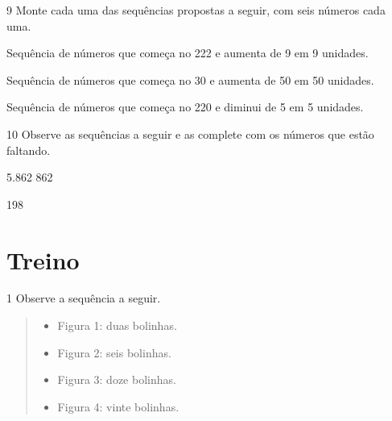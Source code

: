 \begin{mdframed}[linewidth=2pt,linecolor=salmao,roundcorner=2pt]
\vspace{1cm}
\end{mdframed}

\num{9} Monte cada uma das sequências propostas a seguir, com seis números cada uma.

\begin{escolha}
\item
  Sequência de números que começa no 222 e aumenta de 9 em 9 unidades.


\item
  Sequência de números que começa no 30 e aumenta de 50 em 50 unidades.


\item
  Sequência de números que começa no 220 e diminui de 5 em 5 unidades.

\end{escolha}

\num{10} Observe as sequências a seguir e as complete com os números que estão
faltando.

\begin{escolha}
\item 5.862   \quad {}\quad {}  862

\item 198   \quad {}
\end{escolha}

\section{Treino}

\num{1} Observe a sequência a seguir.

\begin{quote}
\begin{itemize}
  \item Figura 1: duas bolinhas.
  \item Figura 2: seis bolinhas.
  \item Figura 3: doze bolinhas.
  \item Figura 4: vinte bolinhas.
\end{itemize}
\end{quote}

